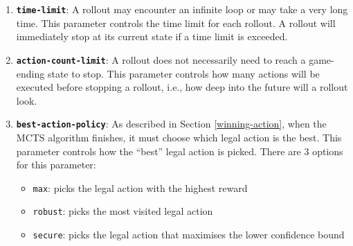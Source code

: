\begin{enumerate}
  \item \textbf{\texttt{time-limit}}: A rollout may encounter an infinite loop or may take a very long time. This parameter controls the time limit for each rollout. A rollout will immediately stop at its current state if a time limit is exceeded. %
  \item \textbf{\texttt{action-count-limit}}: A rollout does not necessarily need to reach a game-ending state to stop. This parameter controls how many actions will be executed before stopping a rollout, i.e., how deep into the future will a rollout look.
  \item \textbf{\texttt{best-action-policy}}: As described in Section \ref{winning-action}, when the MCTS algorithm finishes, it must choose which legal action is the best. This parameter controls how the ``best'' legal action is picked. There are 3 options for this parameter:
  \begin{itemize}
    \item \texttt{max}: picks the legal action with the highest reward
    \item \texttt{robust}: picks the most visited legal action
    \item \texttt{secure}: picks the legal action that maximises the lower confidence bound
  \end{itemize}
\end{enumerate}





